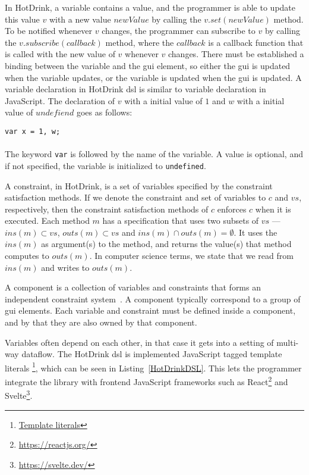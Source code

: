 In HotDrink, a variable contains a value, and the programmer is able to update this value $v$ with a new value $newValue$ by calling the $v.set(newValue)$ method. To be notified whenever $v$ changes, the programmer can subscribe to $v$ by calling the $v.subscribe(callback)$ method, where the $callback$ is a callback function that is called with the new value of $v$ whenever $v$ changes. There must be established a binding between the variable and the \gls{gui} element, so either the \gls{gui} is updated when the variable updates, or the variable is updated when the \gls{gui} is updated. A variable declaration in HotDrink \gls{dsl} is similar to variable declaration in JavaScript. The declaration of $v$ with a initial value of $1$ and $w$ with a initial value of $undefiend$ goes as follows: 

\texttt{var x = 1, w;}\\\\
The keyword \texttt{var} is followed by the name of the variable. A value is optional, and if not specified, the variable is initialized to \texttt{undefined}. 

A constraint, in HotDrink, is a set of variables specified by the constraint satisfaction methods. If we denote the constraint and set of variables to $c$ and $vs$, respectively, then the constraint satisfaction methods of $c$ enforces $c$ when it is executed. Each method $m$ has a specification that uses two subsets of $vs$ --- $ins(m) \subset vs$, $outs(m) \subset vs$ and $ins(m) \cap outs(m) = \emptyset$. It uses the $ins(m)$ as argument(s) to the method, and returns the value(s) that method computes to $outs(m)$. In computer science terms, we state that we read from $ins(m)$ and writes to $outs(m)$.

A component is a collection of variables and constraints that forms an independent constraint system~\cite{svartveit2021multithreaded}. A component typically correspond to a group of \gls{gui} elements. Each variable and constraint must be defined inside a component, and by that they are also owned by that component. 

Variables often depend on each other, in that case it gets into a setting of multi-way dataflow. The HotDrink \gls{dsl} is implemented JavaScript tagged template literals \footnote{\href{https://developer.mozilla.org/en-US/docs/Web/JavaScript/Reference/Template_literals}{Template literals}}, which can be seen in Listing~\ref{HotDrinkDSL}. This lets the programmer integrate the library with frontend JavaScript frameworks such as React\footnote{\url{https://reactjs.org/}} and Svelte\footnote{\url{https://svelte.dev/}}. 

